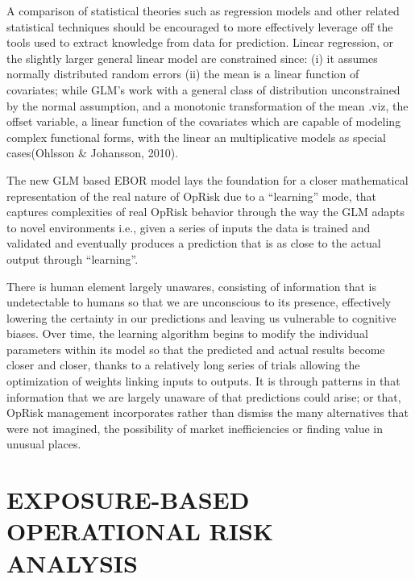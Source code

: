 \documentclass{DissertateUSU}
\begin{document}
A comparison of statistical theories such as regression models and other
related statistical techniques should be encouraged to more effectively
leverage off the tools used to extract knowledge from data for
prediction. Linear regression, or the slightly larger general linear
model are constrained since: (i) it assumes normally distributed random
errors (ii) the mean is a linear function of covariates; while GLM's
work with a general class of distribution unconstrained by the normal
assumption, and a monotonic transformation of the mean .viz, the offset
variable, a linear function of the covariates which are capable of
modeling complex functional forms, with the linear an multiplicative
models as special cases(Ohlsson \& Johansson, 2010).\medskip

The new GLM based EBOR model lays the foundation for a closer
mathematical representation of the real nature of OpRisk due to a
``learning'' mode, that captures complexities of real OpRisk behavior
through the way the GLM adapts to novel environments i.e., given a
series of inputs the data is trained and validated and eventually
produces a prediction that is as close to the actual output through
``learning''.\medskip

There is human element largely unawares, consisting of information that
is undetectable to humans so that we are unconscious to its presence,
effectively lowering the certainty in our predictions and leaving us
vulnerable to cognitive biases. Over time, the learning algorithm begins
to modify the individual parameters within its model so that the
predicted and actual results become closer and closer, thanks to a
relatively long series of trials allowing the optimization of weights
linking inputs to outputs. It is through patterns in that information
that we are largely unaware of that predictions could arise; or that,
OpRisk management incorporates rather than dismiss the many alternatives
that were not imagined, the possibility of market inefficiencies or
finding value in unusual places.

\singlespacing

\FloatBarrier
\newpage
{}
\fancyhead[R]{\thepage}
\fancyfoot[C]{}

\chapter{EXPOSURE-BASED OPERATIONAL RISK ANALYSIS}
\label{EXPOSURE-BASED OPERATIONAL RISK ANALYSIS}
\end{document}
